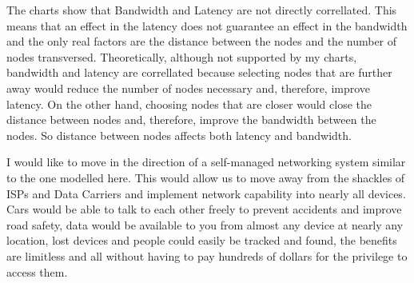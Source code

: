 \documentclass{amsart}
\begin{document}
The charts show that Bandwidth and Latency are not directly correllated. This means that an effect in the latency does not guarantee an effect in the bandwidth and the only real factors are the distance between the nodes and the number of nodes transversed. Theoretically, although not supported by my charts, bandwidth and latency are correllated because selecting nodes that are further away would reduce the number of nodes necessary and, therefore, improve latency. On the other hand, choosing nodes that are closer would close the distance between nodes and, therefore, improve the bandwidth between the nodes. So distance between nodes affects both latency and bandwidth.

I would like to move in the direction of a self-managed networking system similar to the one modelled here. This would allow us to move away from the shackles of ISPs and Data Carriers and implement network capability into nearly all devices. Cars would be able to talk to each other freely to prevent accidents and improve road safety, data would be available to you from almost any device at nearly any location, lost devices and people could easily be tracked and found, the benefits are limitless and all without having to pay hundreds of dollars for the privilege to access them.
\end{document}
